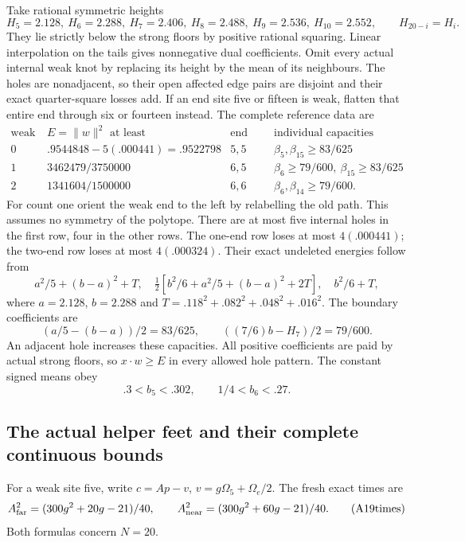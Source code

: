 Take rational symmetric heights
\[
 H_5=2.128,\ H_6=2.288,\ H_7=2.406,\
 H_8=2.488,\ H_9=2.536,\ H_{10}=2.552,\qquad
 H_{20-i}=H_i .
\]
They lie strictly below the strong
floors by positive rational squaring.
Linear interpolation on the tails
gives nonnegative dual coefficients.
Omit every actual internal weak knot
by replacing its height by the mean
of its neighbours.
The holes are nonadjacent, so their
open affected edge pairs are disjoint
and their exact quarter-square losses
add.
If an end site five or fifteen is
weak, flatten that entire end through
six or fourteen instead.
The complete reference data are
\[
\begin{array}{c|c|c|c}
 \text{weak end count}&E=\|w\|^2\text{ at least}
          &\text{end block lengths}&\text{individual capacities}\\ \hline
 0&.9544848-5(.000441)=.9522798&5,5&
             \beta_5,\beta_{15}\ge83/625\\
 1&3462479/3750000&6,5&
             \beta_6\ge79/600,\ \beta_{15}\ge83/625\\
 2&1341604/1500000&6,6&
             \beta_6,\beta_{14}\ge79/600 .
\end{array}
\tag{A19refs}\label{app:exact19:eq:Arefs}
\]
For count one orient the weak end to
the left by relabelling the old path.
This assumes no symmetry of the polytope.
There are at most five internal holes
in the first row, four in the other
rows.
The one-end row loses at most
\(4(.000441)\); the two-end row loses
at most \(4(.000324)\).
Their exact undeleted energies follow
from
\[
 a^2/5+(b-a)^2+T,\quad
 \tfrac12[b^2/6+a^2/5+(b-a)^2+2T],\quad
 b^2/6+T,
\]
where \(a=2.128\), \(b=2.288\) and
\(T=.118^2+.082^2+.048^2+.016^2\).
The boundary coefficients are
\[
 (a/5-(b-a))/2=83/625,\qquad
                    ((7/6)b-H_7)/2=79/600 .
\]
An adjacent hole increases these
capacities.
All positive coefficients are paid
by actual strong floors, so
\(x\cdot w\ge E\) in every allowed
hole pattern.
The constant signed means obey
\[
                  .3<b_5<.302,\qquad1/4<b_6<.27 .
\]

\subsection{The actual helper feet and their complete continuous bounds}
\label{app:exact19:Ahelperfeet}

For a weak site five, write
\(c=Ap-v\), \(v=g\Omega_5+\Omega_e/2\).
The fresh exact times are
\[
 A_{\rm far}^2=(300g^2+20g-21)/40,\qquad
 A_{\rm near}^2=(300g^2+60g-21)/40 .
\tag{A19times}\label{app:exact19:eq:Atimes}
\]
Both formulas concern \(N=20\).

